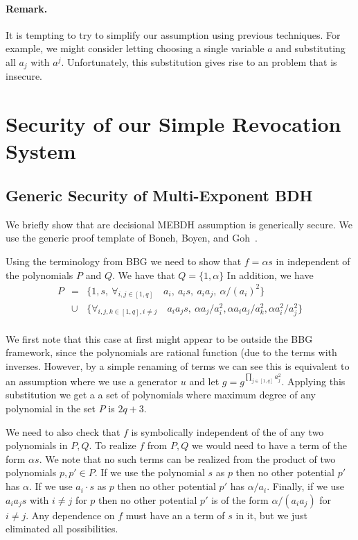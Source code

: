 \documentclass[a4paper, 11pt]{article}
\theoremstyle{definition}
\begin{document}
\paragraph{Remark.} \quad
It is tempting to try to simplify our assumption using previous techniques.
For example, we might consider letting choosing a single variable
$a$ and substituting all $a_j$ with $a^{j}$. Unfortunately, this
substitution gives rise to an problem that is insecure.



\section{Security of our Simple Revocation System}
\subsection{Generic Security of Multi-Exponent BDH}
\label{sec:generic-proof}

We briefly show that are decisional MEBDH assumption is
generically secure.  We use the generic proof template of Boneh,
Boyen, and Goh~\cite{BBG05}.



Using the terminology from BBG we need to show that $f=\alpha s$ in
independent of the polynomials $P$ and $Q$. We have that $Q=\{ 1,\alpha \}$ In
addition, we have
\begin{eqnarray*}
P&=&\{1,s, \
 \forall_{i,j \in [1,q]} \quad a_i, \ a_i s, \ a_i a_j, \  \alpha / (a_i)^2 \}\\
 &\cup & \{ \forall_{i,j,k \in [1,q], i \neq j} \quad a_ia_js, \ \alpha a_j/ a_i^2 ,
\alpha a_i a_j/a_k^2, \alpha a_i^2/ a_j^2 \}\\
\end{eqnarray*}

We first note that this case at first might appear to be outside the
BBG framework, since the polynomials are rational function (due to the
terms with inverses. However, by a simple renaming of terms we can see
this is equivalent to an assumption where we use a generator $u$ and
let $g=g^{\prod_{j \in [1,q]} a_j^2}$.  Applying this substitution we
get a a set of polynomials where maximum degree of any polynomial in
the set $P$ is $2q+3$.

We need to also check that $f$ is symbolically independent of the of
any two polynomials in $P,Q$. To realize $f$ from $P,Q$ we would need
to have a term of the form $\alpha s$. We note that no such terms can
be realized from the product of two polynomials $p,p' \in P$. If we
use the polynomial $s$ as $p$ then no other potential $p'$ has
$\alpha$. If we use $a_i \cdot s$ as $p$ then no other potential $p'$
has $\alpha/a_i$. Finally, if we use $a_ia_j s$ with $i \neq j$ for
$p$ then no other potential $p'$ is of the form $\alpha/(a_i a_j)$ for
$i \neq j$. Any dependence on $f$ must have an a term of $s$ in it,
but we just eliminated all possibilities.
\end{document}
